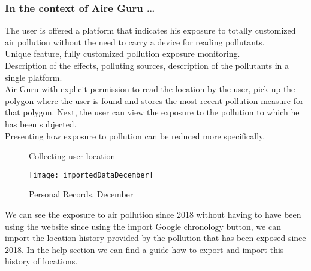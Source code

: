\subsubsection*{In the context of Aire Guru \ldots} 

The user is offered a platform that indicates his exposure to totally customized air pollution without the need to carry a device for reading pollutants.\\

Unique feature, fully customized pollution exposure monitoring. \\

Description of the effects, polluting sources, description of the pollutants in a single platform. \\

Air Guru with explicit permission to read the location by the user, pick up the polygon where
the user is found and stores the most recent pollution measure for that polygon.
Next, the user can view the exposure to the pollution to which he has been subjected.\\

Presenting how exposure to pollution can be reduced more specifically.\\

\begin{figure}[ht]
    \centering 
    \caption{Collecting user location}
\end{figure}

\begin{figure}[ht]
    \centering
    \texttt{[image: importedDataDecember]}
    \caption{Personal Records. December}
\end{figure}

We can see the exposure to air pollution since 2018 without having to have been using the website since
using the import Google chronology button, we can import the location history provided by the pollution that has been exposed since 2018.
In the help section we can find a guide how to export and import this history of locations.
